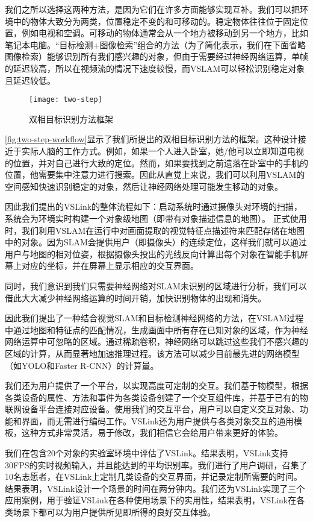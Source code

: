 我们之所以选择这两种方法，是因为它们在许多方面能够实现互补。我们可以把环境中的物体大致分为两类，位置稳定不变的和可移动的。稳定物体往往位于固定位置，例如电视和空调。可移动的物体通常会从一个地方被移动到另一个地方，比如笔记本电脑。“目标检测+图像检索”组合的方法（为了简化表示，我们在下面省略图像检索）能够识别所有我们感兴趣的对象，但由于需要经过神经网络运算，单帧的延迟较高，所以在视频流的情况下速度较慢，而VSLAM可以轻松识别稳定对象且延迟较低。
  
\begin{figure}[htbp]
	\centering
	\texttt{[image: two-step]}
	\caption{双相目标识别方法框架}
	\label{fig:two-step-workflow}
\end{figure}
  
\autoref{fig:two-step-workflow}显示了我们所提出的双相目标识别方法的框架。这种设计接近于实际人脑的工作方式。例如，如果一个人进入卧室，她/他可以立即知道电视的位置，并对自己进行大致的定位。然而，如果要找到之前遗落在卧室中的手机的位置，他需要集中注意力进行搜索。因此从直觉上来说，我们可以利用VSLAM的空间感知快速识别稳定的对象，然后让神经网络处理可能发生移动的对象。

因此我们提出的VSLink的整体流程如下：启动系统时通过摄像头对环境的扫描，系统会为环境实时构建一个对象级地图（即带有对象描述信息的地图）。
正式使用时，我们利用VSLAM在运行中对画面提取的视觉特征点描述符来匹配存储在地图中的对象。因为SLAM会提供用户（即摄像头）的连续定位，这样我们就可以通过用户与地图的相对位姿，根据摄像头投出的光线反向计算出每个对象在智能手机屏幕上对应的坐标，并在屏幕上显示相应的交互界面。

同时，我们意识到我们只需要神经网络对SLAM未识别的区域进行分析，我们可以借此大大减少神经网络运算的时间开销，加快识别物体的出现和消失。

因此我们提出了一种结合视觉SLAM和目标检测神经网络的方法，在VSLAM过程中通过地图和特征点的匹配情况，生成画面中所有存在已知对象的区域，作为神经网络运算中可忽略的区域。通过稀疏卷积\cite{ren2018sbnet}，神经网络可以跳过这些我们不感兴趣的区域的计算，从而显著地加速推理过程。该方法可以减少目前最先进的网络模型（如YOLO和Faster R-CNN）的计算量。

我们还为用户提供了一个平台，以实现高度可定制的交互。我们基于物模型，根据各类设备的属性、方法和事件为各类设备创建了一个交互组件库，并基于已有的物联网设备平台连接对应设备。使用我们的交互平台，用户可以自定义交互对象、功能和界面，而无需进行编码工作。VSLink还为用户提供与各类对象交互的通用模板，这种方式非常灵活，易于修改，我们相信它会给用户带来更好的体验。

我们在包含20个对象的实验室环境中评估了VSLink。结果表明，VSLink支持30FPS的实时视频输入，并且能达到{\acc}的平均识别率。我们进行了用户调研，召集了10名志愿者，在VSLink上定制几类设备的交互界面，并记录定制所需要的时间。结果表明，VSLink设计一个场景的时间在两分钟内。我们还为VSLink实现了三个应用案例，用于验证VSLink在各种使用场景下的实用性，结果表明，VSLink在各类场景下都可以为用户提供所见即所得的良好交互体验。

